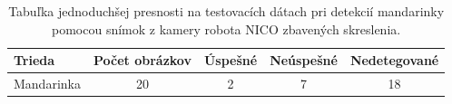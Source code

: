 \begin{table}[H]
\begin{tabular}{|l|c|c|c|c|}
\hline
\textbf{Trieda} & \textbf{Počet obrázkov} & \textbf{Úspešné} & \textbf{Neúspešné} &  \textbf{Nedetegované}\\
\hline
Mandarinka & 20 & 2 & 7 & 18\\
\hline
\end{tabular}
\centering
\caption{Tabuľka jednoduchšej presnosti na testovacích dátach pri detekcií mandarinky pomocou snímok z kamery robota NICO zbavených skreslenia.}
\label{tab:table703}
\end{table}
